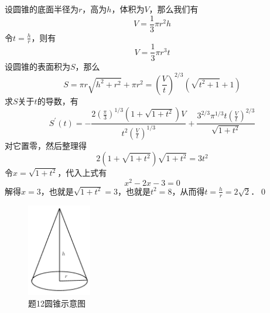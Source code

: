 \solve 设圆锥的底面半径为$r$，高为$h$，体积为$V$，那么我们有
\begin{equation}
    V = \frac{1}{3} \pi r^2 h 
\end{equation}
令$t = \displaystyle\frac{h}{r}$，则有
\begin{equation}
    V = \frac{1}{3} \pi r^3 t
\end{equation}
设圆锥的表面积为$S$，那么
\begin{equation}
    S = \pi r \sqrt{h^2 + r^2} + \pi r^2 = \left(\frac{V}{t}\right)^{2/3} \left(\sqrt{t^2+1} + 1\right)
\end{equation}
求$S$关于$t$的导数，有
\begin{equation}
    S^{\prime}(t) = -\frac{2 \left(\displaystyle\frac{\pi}{3}\right)^{1/3}\left(1+\sqrt{1+t^2}\right)V}{t^2 \left(\displaystyle\frac{V}{t}\right)^{1/3}} + \frac{3^{2/3} \pi^{1/3} t \left(\displaystyle\frac{V}{t}\right)^{2/3}}{\sqrt{1+t^2}}
\end{equation}
对它置零，然后整理得
\begin{equation}
    2 \left(1+\sqrt{1+t^2}\right)\sqrt{1+t^2}=3t^2
\end{equation}
令$x = \sqrt{1+t^2}$，代入上式有
\begin{equation}
    x^2 - 2x - 3 = 0
\end{equation}
解得$x = 3$，也就是$\sqrt{1+t^2} = 3$，也就是$t^2 = 8$，从而得$t = \displaystyle\frac{h}{r} = 2\sqrt{2}$．\qed\bigskip

\begin{figure}[H]
    \centering
    \includegraphics[width=0.25\textwidth]{chapter3/cone.png}
    \caption{题12圆锥示意图}
\end{figure}